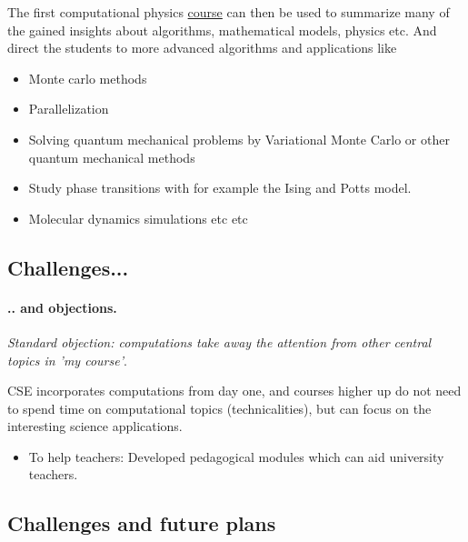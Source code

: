 \documentclass[%
twoside,                 %
final,                   %
10pt]{article}
\begin{document}
The first computational physics \href{{http://www.uio.no/studier/emner/matnat/fys/FYS3150/h14/}}{course} can then be used to summarize many of the gained insights about algorithms, mathematical models, physics etc. And direct the students to more advanced algorithms and applications like

\begin{itemize}
\item Monte carlo methods

\item Parallelization

\item Solving quantum mechanical problems by Variational Monte Carlo  or other quantum mechanical methods

\item Study phase transitions with for example the Ising and Potts model.

\item Molecular dynamics simulations etc etc 
\end{itemize}

\noindent




\subsection*{Challenges...}

\paragraph{.. and objections.}

\emph{Standard objection: computations take away the attention from other central topics in 'my course'}. 

CSE incorporates computations from day one, and courses higher up do not need to
spend time on computational topics  (technicalities), but can focus on the interesting
science applications.

\begin{itemize}
\item To help teachers: Developed pedagogical modules which can aid university teachers.
\end{itemize}

\noindent



\subsection*{Challenges and future plans}
\end{document}
